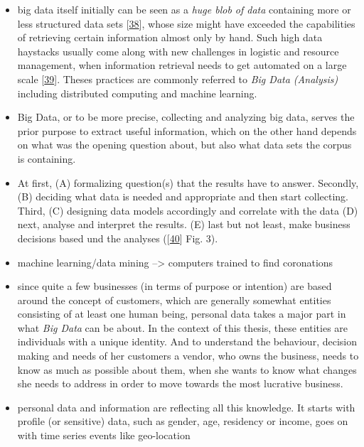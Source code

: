 \documentclass[12pt,english,a4paper,titlepage,cleardoublepage=empty,dottedtoc]{report}
\begin{document}
\begin{itemize}
\item
  big data itself initially can be seen as a \emph{huge blob of data}
  containing more or less structured data sets
  {[}\protect\hyperlink{ref-web_2016_oxford_definition_big-data}{38}{]},
  whose size might have exceeded the capabilities of retrieving certain
  information almost only by hand. Such high data haystacks usually come
  along with new challenges in logistic and resource management, when
  information retrieval needs to get automated on a large scale
  {[}\protect\hyperlink{ref-web_2016_wikipedia_definition_big-data}{39}{]}.
  Theses practices are commonly referred to \emph{Big Data (Analysis)}
  including distributed computing and machine learning.
\item
  Big Data, or to be more precise, collecting and analyzing big data,
  serves the prior purpose to extract useful information, which on the
  other hand depends on what was the opening question about, but also
  what data sets the corpus is containing.
\item
  At first, (A) formalizing question(s) that the results have to answer.
  Secondly, (B) deciding what data is needed and appropriate and then
  start collecting. Third, (C) designing data models accordingly and
  correlate with the data (D) next, analyse and interpret the results.
  (E) last but not least, make business decisions based und the analyses
  ({[}\protect\hyperlink{ref-paper_2015_big-data-analytics_a-survey}{40}{]}
  Fig. 3).
\item
  machine learning/data mining --\textgreater{} computers trained to
  find coronations
\item
  since quite a few businesses (in terms of purpose or intention) are
  based around the concept of customers, which are generally somewhat
  entities consisting of at least one human being, personal data takes a
  major part in what \emph{Big Data} can be about. In the context of
  this thesis, these entities are individuals with a unique identity.
  And to understand the behaviour, decision making and needs of her
  customers a vendor, who owns the business, needs to know as much as
  possible about them, when she wants to know what changes she needs to
  address in order to move towards the most lucrative business.
\item
  personal data and information are reflecting all this knowledge. It
  starts with profile (or sensitive) data, such as gender, age,
  residency or income, goes on with time series events like geo-location

\end{itemize}
\end{document}
